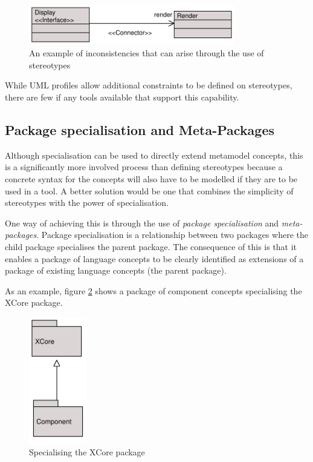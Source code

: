 \begin{figure}[htb]
\begin{center}
\includegraphics[width=9cm]{LanguageFamilies/figures/WrongStereotypes}
\caption{An example of inconsistencies that can arise through the
use of stereotypes} \label{wrongstereotypes}
\end{center}
\end{figure}

\noindent While UML profiles \cite{umlspec} allow additional
constraints to be defined on stereotypes, there are few if any
tools available that support this capability.

\subsection{Package specialisation and Meta-Packages}
\label{metapackages}

Although specialisation can be used to directly extend metamodel
concepts, this is a significantly more involved process than
defining stereotypes because a concrete syntax for the concepts
will also have to be modelled if they are to be used in a tool. A
better solution would be one that combines the simplicity of
stereotypes with the power of specialisation.

One way of achieving this is through the use of {\em package
specialisation} and {\em meta-packages}. Package specialisation is
a relationship between two packages where the child package
specialises the parent package. The consequence of this is that it
enables a package of language concepts to be clearly identified as
extensions of a package of existing language concepts (the parent
package).

As an example, figure \ref{componentspecialisation} shows a
package of component concepts specialising the XCore package.

\begin{figure}[htb]
\begin{center}
\includegraphics[width=2.5cm]{LanguageFamilies/figures/componentspecialisation}
\caption{Specialising the XCore package}
\label{componentspecialisation}
\end{center}
\end{figure}

